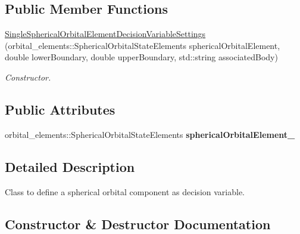 \subsection*{Public Member Functions}
\begin{DoxyCompactItemize}
\item 
\hyperlink{structtudat_1_1optimization_1_1SingleSphericalOrbitalElementDecisionVariableSettings_a6ba82cefdb0c769a2cdf177214854afe}{Single\+Spherical\+Orbital\+Element\+Decision\+Variable\+Settings} (orbital\+\_\+elements\+::\+Spherical\+Orbital\+State\+Elements spherical\+Orbital\+Element, double lower\+Boundary, double upper\+Boundary, std\+::string associated\+Body)
\begin{DoxyCompactList}\small\item\em Constructor. \end{DoxyCompactList}\end{DoxyCompactItemize}
\subsection*{Public Attributes}
\begin{DoxyCompactItemize}
\item 
orbital\+\_\+elements\+::\+Spherical\+Orbital\+State\+Elements {\bfseries spherical\+Orbital\+Element\+\_\+}\hypertarget{structtudat_1_1optimization_1_1SingleSphericalOrbitalElementDecisionVariableSettings_a5631d7ab127fd6848596ba6dc5b794fc}{}\label{structtudat_1_1optimization_1_1SingleSphericalOrbitalElementDecisionVariableSettings_a5631d7ab127fd6848596ba6dc5b794fc}

\end{DoxyCompactItemize}


\subsection{Detailed Description}
Class to define a spherical orbital component as decision variable. 

\subsection{Constructor \& Destructor Documentation}
